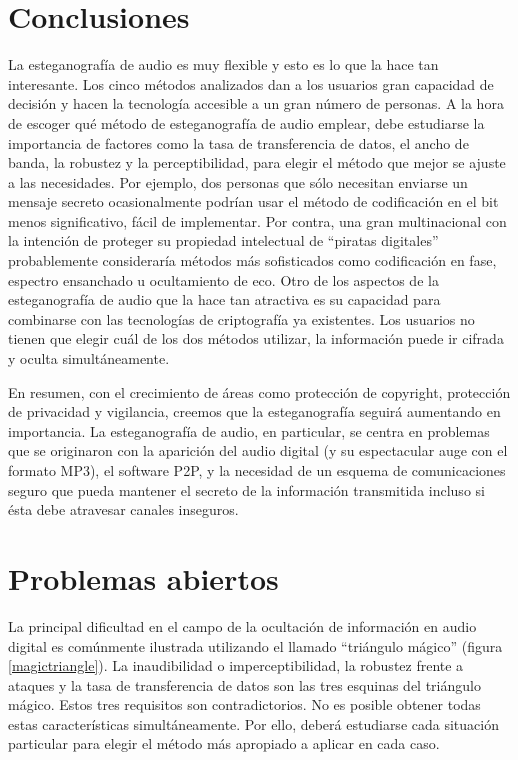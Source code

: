 \documentclass[12pt]{article}
\begin{document}
\newpage
\section{Conclusiones}

La esteganografía de audio es muy flexible y esto es lo que la hace tan interesante. Los cinco métodos analizados dan a los usuarios gran capacidad de decisión y hacen la tecnología accesible a un gran número de personas. A la hora de escoger qué método de esteganografía de audio emplear, debe estudiarse la importancia de factores como la tasa de transferencia de datos, el ancho de banda, la robustez y la perceptibilidad, para elegir el método que mejor se ajuste a las necesidades. Por ejemplo, dos personas que sólo necesitan enviarse un mensaje secreto ocasionalmente podrían usar el método de codificación en el bit menos significativo, fácil de implementar. Por contra, una gran multinacional con la intención de proteger su propiedad intelectual de ``piratas digitales'' probablemente consideraría métodos más sofisticados como codificación en fase, espectro ensanchado u ocultamiento de eco. Otro de los aspectos de la esteganografía de audio que la hace tan atractiva es su capacidad para combinarse con las tecnologías de criptografía ya existentes. Los usuarios no tienen que elegir cuál de los dos métodos utilizar, la información puede ir cifrada y oculta simultáneamente.

En resumen, con el crecimiento de áreas como protección de copyright, protección de privacidad y vigilancia, creemos que la esteganografía seguirá aumentando en importancia. La esteganografía de audio, en particular, se centra en problemas que se originaron con la aparición del audio digital (y su espectacular auge con el formato MP3), el software P2P, y la necesidad de un esquema de comunicaciones seguro que pueda mantener el secreto de la información transmitida incluso si ésta debe atravesar canales inseguros.

\newpage
\section{Problemas abiertos}

La principal dificultad en el campo de la ocultación de información en audio digital es comúnmente ilustrada utilizando el llamado ``triángulo mágico'' (figura \ref{magictriangle}). La inaudibilidad o imperceptibilidad, la robustez frente a ataques y la tasa de transferencia de datos son las tres esquinas del triángulo mágico. Estos tres requisitos son contradictorios. No es posible obtener todas estas características simultáneamente. Por ello, deberá estudiarse cada situación particular para elegir el método más apropiado a aplicar en cada caso.
\end{document}
